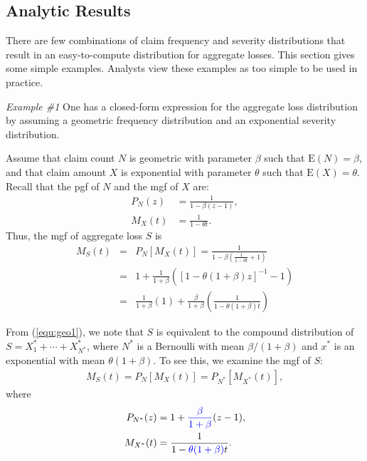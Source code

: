\documentclass[12pt,letterpaper]{article}
\begin{document}
\subsection{Analytic Results}


There are few combinations of claim frequency and severity distributions that result in an easy-to-compute distribution for aggregate losses. This section gives some simple examples. Analysts view these examples as too simple to be used in practice.

\bigskip
\textit{Example \#1} One has a closed-form expression for the aggregate loss distribution by assuming a geometric frequency distribution and an exponential severity distribution.

Assume that claim count $N$ is geometric with parameter $\beta$ such that $\mathrm{E}(N)=\beta$, and that claim amount $X$ is exponential with parameter $\theta$ such that $\mathrm{E}(X)=\theta$. Recall that the pgf of $N$ and the mgf of $X$ are:
\begin{align*}
P_N (z) &=\frac{1}{1- \beta (z-1)},\\
M_{X}(t) &=\frac{1}{1-\theta t}.
\end{align*}
Thus, the mgf of aggregate loss $S$ is
\begin{eqnarray}
M_{S}(t) &=& P_N [M_{X}(t)] = \frac{1}{1 - \beta \left( \frac{1}{1-\theta t} + 1\right)} \nonumber\\
&=& 1+ \frac{1}{1+\beta} ([1-\theta(1+\beta)z]^{-1}-1) \label{equ:geo1}\\
&=& \frac{1}{1+\beta}(1) +\frac{\beta}{1+\beta}
\left( \frac{1}{1-\theta (1+\beta)t}\right)   \label{equ:geo2}
\end{eqnarray}

From (\ref{equ:geo1}), we note that $S$ is equivalent to the compound distribution of $S=X^{*}_1+\cdots+X^{*}_{N^{*}}$, where $N^{*}$ is a Bernoulli with mean $\beta/(1+\beta)$ and $x^{*}$ is an exponential with mean $\theta(1+\beta)$. To see this, we examine the mgf of $S$:
\begin{align*}
M_{S}(t) = P_N [M_{X}(t)] = P_{N^{*}} [M_{X^{*}}(t)],
\end{align*}
where
\begin{align*}
P_{N^*} (z) &=1+ {\color{blue}\frac{\beta}{1+ \beta}} (z-1),\\
M_{X^*} (t) &=\frac{1}{1- {\color{blue}\theta(1+\beta)} t}.
\end{align*}
\end{document}
